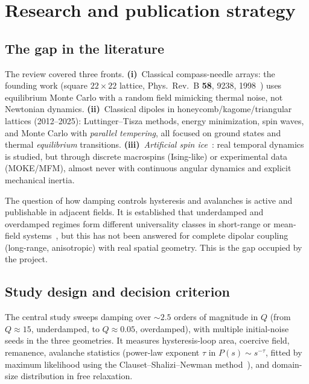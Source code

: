 \documentclass[11pt,a4paper]{article}
\begin{document}
\section{Research and publication strategy}
\label{sec:pesquisa}

\subsection{The gap in the literature}

\noindent The review covered three fronts. \textbf{(i)}~Classical compass-needle arrays: the founding work (square $22\times22$ lattice, Phys.\ Rev.\ B \textbf{58}, 9238, 1998~\cite{prb1998}) uses equilibrium Monte Carlo with a random field mimicking thermal noise, not Newtonian dynamics. \textbf{(ii)}~Classical dipoles in honeycomb/kagome/triangular lattices (2012--2025): Luttinger--Tisza methods, energy minimization, spin waves, and Monte Carlo with \emph{parallel tempering}, all focused on ground states and thermal \emph{equilibrium} transitions. \textbf{(iii)}~\emph{Artificial spin ice}~\cite{nisoli2013}: real temporal dynamics is studied, but through discrete macrospins (Ising-like) or experimental data (MOKE/MFM), almost never with continuous angular dynamics and explicit mechanical inertia.

The question of how damping controls hysteresis and avalanches is active and publishable in adjacent fields. It is established that underdamped and overdamped regimes form different universality classes in short-range or mean-field systems~\cite{dahmen2011}, but this has not been answered for complete dipolar coupling (long-range, anisotropic) with real spatial geometry. This is the gap occupied by the project.

\subsection{Study design and decision criterion}

The central study sweeps damping over $\sim 2.5$ orders of magnitude in $Q$ (from $Q \approx 15$, underdamped, to $Q \approx 0.05$, overdamped), with multiple initial-noise seeds in the three geometries. It measures hysteresis-loop area, coercive field, remanence, avalanche statistics (power-law exponent $\tau$ in $P(s) \sim s^{-\tau}$, fitted by maximum likelihood using the Clauset--Shalizi--Newman method~\cite{clauset2009}), and domain-size distribution in free relaxation.
\end{document}
